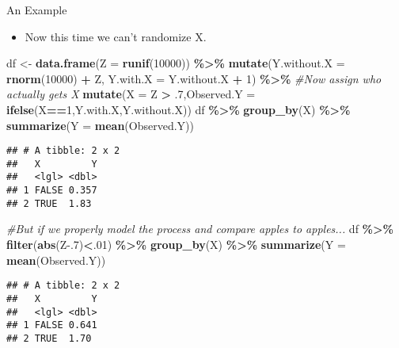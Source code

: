 \documentclass[
  ignorenonframetext,
]{beamer}
\newenvironment{Shaded}{\begin{snugshade}}{\end{snugshade}}
\newcommand{\AttributeTok}[1]{\textcolor[rgb]{0.13,0.29,0.53}{#1}}
\newcommand{\CommentTok}[1]{\textcolor[rgb]{0.56,0.35,0.01}{\textit{#1}}}
\newcommand{\DecValTok}[1]{\textcolor[rgb]{0.00,0.00,0.81}{#1}}
\newcommand{\FloatTok}[1]{\textcolor[rgb]{0.00,0.00,0.81}{#1}}
\newcommand{\FunctionTok}[1]{\textcolor[rgb]{0.13,0.29,0.53}{\textbf{#1}}}
\newcommand{\NormalTok}[1]{#1}
\newcommand{\OtherTok}[1]{\textcolor[rgb]{0.56,0.35,0.01}{#1}}
\newcommand{\SpecialCharTok}[1]{\textcolor[rgb]{0.81,0.36,0.00}{\textbf{#1}}}
\providecommand{\tightlist}{%
  \setlength{\itemsep}{0pt}\setlength{\parskip}{0pt}}
\begin{document}
\begin{frame}[fragile]{An Example}
\label{an-example-1}
\begin{itemize}
\tightlist
\item
  Now this time we can't randomize X.
\end{itemize}

\begin{Shaded}
\begin{Highlighting}[]
\NormalTok{df }\OtherTok{\textless{}{-}} \FunctionTok{data.frame}\NormalTok{(}\AttributeTok{Z =} \FunctionTok{runif}\NormalTok{(}\DecValTok{10000}\NormalTok{)) }\SpecialCharTok{\%\textgreater{}\%} \FunctionTok{mutate}\NormalTok{(}\AttributeTok{Y.without.X =} \FunctionTok{rnorm}\NormalTok{(}\DecValTok{10000}\NormalTok{) }\SpecialCharTok{+}\NormalTok{ Z, }\AttributeTok{Y.with.X =}\NormalTok{ Y.without.X }\SpecialCharTok{+} \DecValTok{1}\NormalTok{) }\SpecialCharTok{\%\textgreater{}\%}
  \CommentTok{\#Now assign who actually gets X}
  \FunctionTok{mutate}\NormalTok{(}\AttributeTok{X =}\NormalTok{ Z }\SpecialCharTok{\textgreater{}}\NormalTok{ .}\DecValTok{7}\NormalTok{,}\AttributeTok{Observed.Y =} \FunctionTok{ifelse}\NormalTok{(X}\SpecialCharTok{==}\DecValTok{1}\NormalTok{,Y.with.X,Y.without.X))}
\NormalTok{df }\SpecialCharTok{\%\textgreater{}\%} \FunctionTok{group\_by}\NormalTok{(X) }\SpecialCharTok{\%\textgreater{}\%} \FunctionTok{summarize}\NormalTok{(}\AttributeTok{Y =} \FunctionTok{mean}\NormalTok{(Observed.Y))}
\end{Highlighting}
\end{Shaded}

\begin{verbatim}
## # A tibble: 2 x 2
##   X         Y
##   <lgl> <dbl>
## 1 FALSE 0.357
## 2 TRUE  1.83
\end{verbatim}

\begin{Shaded}
\begin{Highlighting}[]
\CommentTok{\#But if we properly model the process and compare apples to apples...}
\NormalTok{df }\SpecialCharTok{\%\textgreater{}\%} \FunctionTok{filter}\NormalTok{(}\FunctionTok{abs}\NormalTok{(Z}\FloatTok{{-}.7}\NormalTok{)}\SpecialCharTok{\textless{}}\NormalTok{.}\DecValTok{01}\NormalTok{) }\SpecialCharTok{\%\textgreater{}\%} \FunctionTok{group\_by}\NormalTok{(X) }\SpecialCharTok{\%\textgreater{}\%} \FunctionTok{summarize}\NormalTok{(}\AttributeTok{Y =} \FunctionTok{mean}\NormalTok{(Observed.Y))}
\end{Highlighting}
\end{Shaded}

\begin{verbatim}
## # A tibble: 2 x 2
##   X         Y
##   <lgl> <dbl>
## 1 FALSE 0.641
## 2 TRUE  1.70
\end{verbatim}
\end{frame}
\end{document}

